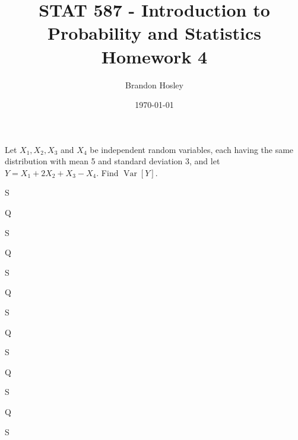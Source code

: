 \documentclass[answers]{exam}
\title{STAT 587 - Introduction to Probability and Statistics%
	\\ Homework 4}
\author{Brandon Hosley}
\date{\today}
\begin{document}
\maketitle
\begin{questions}

\question 
Let \(X_1,X_2,X_3\) and \(X_4\) be independent random variables, each having the same distribution with mean 5 and standard deviation 3, and let \(Y = X_1+2X_2+X_3-X_4\). Find \(\operatorname{Var}[Y]\).
\begin{solution}
	S
\end{solution}

\question 
Q
\begin{solution}
	S
\end{solution}

\question 
Q
\begin{solution}
	S
\end{solution}

\question 
Q
\begin{solution}
	S
\end{solution}

\question 
Q
\begin{solution}
	S
\end{solution}

\question 
Q
\begin{solution}
	S
\end{solution}

\question 
Q
\begin{solution}
	S
\end{solution}


\end{questions}
\end{document}
